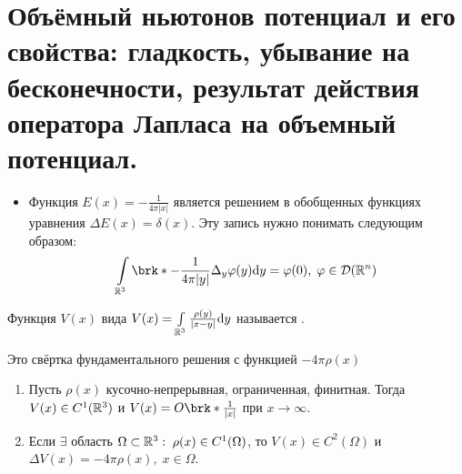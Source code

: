 \section{Объёмный ньютонов потенциал и его свойства: гладкость, убывание на бесконечности, результат действия оператора Лапласа на объемный потенциал.}

\begin{itemize}
	\item Функция $E(x) = -\frac{1}{4\pi|x|}$ является решением в обобщенных функциях уравнения $\Delta E(x) = \delta (x)$. Эту запись нужно понимать следующим образом:
    $$
    \int\limits_{\R^3}\brk*{-\frac{1}{4\pi|y|}}\Delta_y \varphi (y) \mathrm{d}y = \varphi(0),\; \varphi \in \mathcal{D}(\R^n)
    $$
\end{itemize}

\begin{definition}
	Функция $V (x)$ вида $V (x) = \int\limits_{\mathbb{R}^3}\frac{\rho (y)}{|x-y|}\mathrm{d}y$ называется \underline{\it {}}.
\end{definition}

\begin{remark} 
Это свёртка фундаментального решения с функцией $-4\pi\rho (x)$
\end{remark}

\begin{theorem}

	\begin{enumerate}
		\item Пусть $\rho (x)$ \text{--} кусочно-непрерывная, ограниченная, финитная. Тогда $V (x) \in C^1(\mathbb{R}^3)$ и $  V (x) = O\brk*{\frac{1}{|x|}}$ при $x\rightarrow \infty $.
        \item Если $\exists$ область $\Omega \subset \mathbb{R}^3: \;\rho (x) \in C^1(\Omega)$, то $V (x) \in C^2 (\Omega)$ и $\Delta V (x) = -4\pi \rho (x), \;x \in \Omega$.
	\end{enumerate}
\end{theorem}

